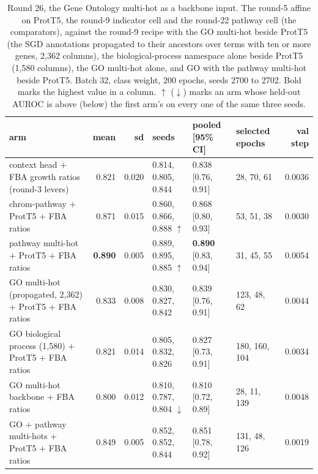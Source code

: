 \begin{table}[H]
  \centering
  \scriptsize
  \caption[Round 26, the Gene Ontology multi-hot as a backbone input]{Round 26, the Gene Ontology multi-hot as a backbone input. The round-5 affine on ProtT5, the round-9 indicator cell and the round-22 pathway cell (the comparators), against the round-9 recipe with the GO multi-hot beside ProtT5 (the SGD annotations propagated to their ancestors over terms with ten or more genes, 2,362 columns), the biological-process namespace alone beside ProtT5 (1,580 columns), the GO multi-hot alone, and GO with the pathway multi-hot beside ProtT5. Batch 32, class weight, 200 epochs, seeds 2700 to 2702. Bold marks the highest value in a column. $\uparrow$ ($\downarrow$) marks an arm whose held-out AUROC is above (below) the first arm's on every one of the same three seeds.}
  \label{tab:w42}
  \begin{tabular}{@{}lrrlllr@{}}
    \hline
    arm & mean & sd & seeds & pooled [95\% CI] & selected epochs & val step \\
    \hline
    context head $+$ FBA growth ratios (round-3 levers) & 0.821 & 0.020 & 0.814, 0.805, 0.844 & 0.838 [0.76, 0.91] & 28, 70, 61 & 0.0036 \\
    chrom-pathway $+$ ProtT5 $+$ FBA ratios & 0.871 & 0.015 & 0.860, 0.866, 0.888 $\uparrow$ & 0.868 [0.80, 0.93] & 53, 51, 38 & 0.0030 \\
    pathway multi-hot $+$ ProtT5 $+$ FBA ratios & \textbf{0.890} & 0.005 & 0.889, 0.895, 0.885 $\uparrow$ & \textbf{0.890} [0.83, 0.94] & 31, 45, 55 & 0.0054 \\
    GO multi-hot (propagated, 2,362) $+$ ProtT5 $+$ FBA ratios & 0.833 & 0.008 & 0.830, 0.827, 0.842 & 0.839 [0.76, 0.91] & 123, 48, 62 & 0.0044 \\
    GO biological process (1,580) $+$ ProtT5 $+$ FBA ratios & 0.821 & 0.014 & 0.805, 0.832, 0.826 & 0.827 [0.73, 0.91] & 180, 160, 104 & 0.0034 \\
    GO multi-hot backbone $+$ FBA ratios & 0.800 & 0.012 & 0.810, 0.787, 0.804 $\downarrow$ & 0.810 [0.72, 0.89] & 28, 11, 139 & 0.0048 \\
    GO $+$ pathway multi-hots $+$ ProtT5 $+$ FBA ratios & 0.849 & 0.005 & 0.852, 0.852, 0.844 & 0.851 [0.78, 0.92] & 131, 48, 126 & 0.0019 \\
    \hline
  \end{tabular}
\end{table}
